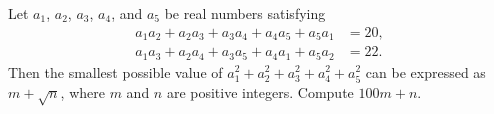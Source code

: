 Let $a_1$, $a_2$, $a_3$, $a_4$, and $a_5$ be real numbers satisfying
\begin{align*}
a_1a_2 + a_2a_3 + a_3a_4 + a_4a_5 + a_5a_1 & = 20,\\
a_1a_3 + a_2a_4 + a_3a_5 + a_4a_1 + a_5a_2 & = 22.
\end{align*}Then the smallest possible value of $a_1^2 + a_2^2 + a_3^2 + a_4^2 + a_5^2$ can be expressed as $m + \sqrt{n}$, where $m$ and $n$ are positive integers. Compute $100m + n$.
